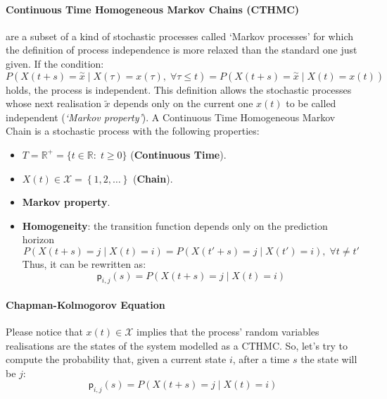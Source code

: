 \documentclass[12pt,a4paper]{article}
\newcommand*{\transp}{\mathsf{p}}
\begin{document}
\paragraph{Continuous Time Homogeneous Markov Chains (CTHMC)} are a subset of a kind of stochastic processes called `Markov processes' for which the definition of process independence is more relaxed than the standard one just given. If the condition:
$$
P\left(X(t+s)=\overset{\sim}{x} \mid X(\tau)=
x(\tau),\;\forall\tau\leq t\right)=
P\left(X(t+s)=\overset{\sim}{x} \mid X(t)=x(t)\right)
$$
holds, the process is independent. This definition allows the stochastic processes whose next realisation $\tilde{x}$ depends only on the current one $x(t)$ to be called independent (\textit{`Markov property'}).
\newline
A Continuous Time Homogeneous Markov Chain is a stochastic process with the following properties:
\begin{itemize}
\item $T=\mathbb{R}^+=\{t\in\mathbb{R}:\;t\geq 0\}$ (\textbf{Continuous Time}).
\item $X(t)\in \mathcal{X}=\left\lbrace 1,2,\dots\right\rbrace$ (\textbf{Chain}).
\item \textbf{Markov property}.
\item \textbf{Homogeneity}: the transition function depends only on the prediction horizon
$$
P\left(X(t+s)=j \mid X(t)=i\right) = P\left(X(t'+s)=j \mid X(t')=i\right),\;\forall t\neq t'
$$
Thus, it can be rewritten as:
$$
\transp_{i,j}(s) = P\left(X(t+s)=j \mid X(t)=i\right)
$$
\end{itemize} 
\paragraph{Chapman-Kolmogorov Equation}
Please notice that $x(t)\in \mathcal{X}$ implies that the process' random variables realisations are the states of the system modelled as a CTHMC. So, let's try to compute the probability that, given a current state $i$, after a time $s$ the state will be $j$:
\begin{equation*}
\transp_{i,j}(s) = P\left(X(t+s)=j \mid X(t)=i\right)
\end{equation*}
\end{document}

